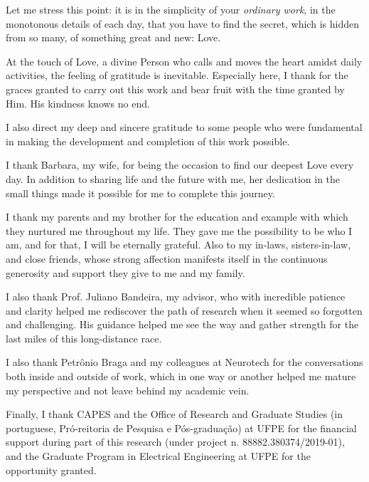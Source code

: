 %

\begin{openingquote}
    Let me stress this point: it is in the simplicity of your \emph{ordinary work}, in the monotonous details of each day, that you have to find the secret, which is hidden from so many, of something great and new: Love. \cite[n. 489]{escriva2016sulco}
\end{openingquote}

At the touch of Love, a divine Person who calls and moves the heart amidst daily activities, the feeling of gratitude is inevitable. Especially here, I thank for the graces granted to carry out this work and bear fruit with the time granted by Him. His kindness knows no end.

I also direct my deep and sincere gratitude to some people who were fundamental in making the development and completion of this work possible.

I thank Barbara, my wife, for being the occasion to find our deepest Love every day. In addition to sharing life and the future with me, her dedication in the small things made it possible for me to complete this journey.

I thank my parents and my brother for the education and example with which they nurtured me throughout my life. They gave me the possibility to be who I am, and for that, I will be eternally grateful. Also to my in-laws, sisters-in-law, and close friends, whose strong affection manifests itself in the continuous generosity and support they give to me and my family.

I also thank Prof. Juliano Bandeira, my advisor, who with incredible patience and clarity helped me rediscover the path of research when it seemed so forgotten and challenging. His guidance helped me see the way and gather strength for the last miles of this long-distance race.

I also thank Petrônio Braga and my colleagues at Neurotech for the conversations both inside and outside of work, which in one way or another helped me mature my perspective and not leave behind my academic vein.

Finally, I thank CAPES and the Office of Research and Graduate Studies (in portuguese, Pr\'o-reitoria de Pesquisa e P\'os-gradua\c c\~ao) at UFPE for the financial support during part of this research (under project n. 88882.380374/2019-01), and the Graduate Program in Electrical Engineering at UFPE for the opportunity granted.
